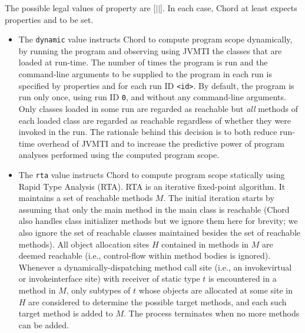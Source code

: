 The possible legal values of property  are
[$|$$|$].  In each case, Chord at
least expects properties  and
 to be set.

\begin{itemize}
\item
The {\tt dynamic} value instructs Chord to compute program scope
dynamically, by running the program and observing using JVMTI the
classes that are loaded at run-time.  The number of times the program
is run and the command-line arguments to be supplied to the program in
each run is specified by properties  and
 for each run ID {\tt <id>}.  By default, the
program is run only once, using run ID {\tt 0}, and without any
command-line arguments.  Only classes loaded in some run are regarded
as reachable but {\it all} methods of each loaded class are regarded
as reachable regardless of whether they were invoked in the run.  The
rationale behind this decision is to both reduce run-time overhead of
JVMTI and to increase the predictive power of program analyses
performed using the computed program scope.

\item
The {\tt rta} value instructs Chord to compute program scope
statically using Rapid Type Analysis (RTA).
RTA is an iterative fixed-point algorithm.  It maintains a set of
reachable methods $M$.  The initial iteration starts by assuming that
only the main method in the main class is reachable (Chord also
handles class initializer methods but we ignore them here for brevity;
we also ignore the set of reachable classes maintained besides the set
of reachable methods).  All object allocation sites $H$ contained in
methods in $M$ are deemed reachable (i.e., control-flow within method
bodies is ignored).  Whenever a dynamically-dispatching method call
site (i.e., an invokevirtual or invokeinterface site) with receiver of
static type $t$ is encountered in a method in $M$, only subtypes of
$t$ whose objects are allocated at some site in $H$ are considered to
determine the possible target methods, and each such target method is
added to $M$.  The process terminates when no more methods can be
added.


\end{itemize}
